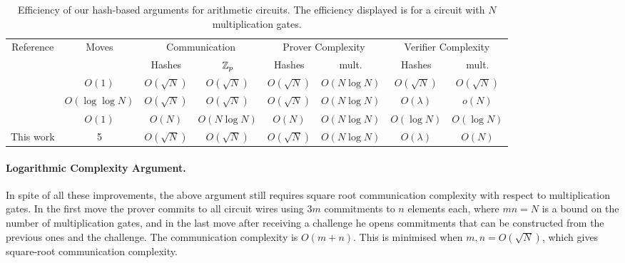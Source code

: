 \begin{table}
\vspace{20mm}
\centering
\begin{tabular}{|c|c|cc|cc|cc|}
\hline
Reference & Moves &\multicolumn{2}{c|}{ Communication}&\multicolumn{2}{c|}{Prover Complexity}&\multicolumn{2}{c|}{Verifier Complexity}\\
&& Hashes & $\mathbb{Z}_p$ & Hashes & mult. & Hashes & mult. \\
\hline
\cite{CCS:AHIV17}& $O(1)$& $O(\sqrt{N})$  & $O(\sqrt{N})$ & $O(\sqrt{N})$ & $O(N\log N)$& $O(\sqrt{N})$ & $O(\sqrt{N})$ \\
\cite{BootleCGGHJ17}& $O(\log \log N)$ &$O(\sqrt{N})$&$O(\sqrt{N})$&$O(\sqrt{N})$ &$O\left(N \log N\right)$&$O(\lambda)$&$o(N)$ \\
\cite{Ben-SassonBHR18}& $O(1)$ &$O(N)$&$O(N \log N)$&$O(N)$ & $O(N \log N)$ &  $O(\log N)$&$O(\log N)$\\
\hline
This work & 5& $O(\sqrt{N})$&$O(\sqrt{N})$&$O(\sqrt{N})$& $O(N \log{N})$ &$O(\lambda)$ & $O(N)$ \\
\hline
\end{tabular}
\vspace{.2cm}
\caption{Efficiency of our hash-based arguments for arithmetic circuits. The efficiency displayed is for a circuit with $N$ multiplication gates.\label{table:previous2}} 
\vspace{-.5cm}
\end{table}

\paragraph{Logarithmic Complexity Argument.}
In spite of all these improvements, the above argument still requires square root communication complexity with respect to multiplication gates. In the first move the prover commits to all circuit wires using $3m$ commitments to $n$ elements each, where $mn=N$ is a bound on the number of multiplication gates, and in the last move after receiving a challenge he opens commitments that can be constructed from the previous ones and the challenge. The communication complexity is $O(m+n)$. This is minimised when $m, n = O(\sqrt{N})$, which gives square-root communication complexity.

